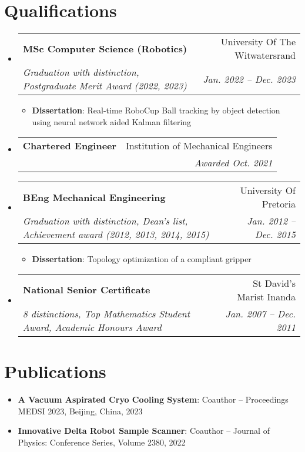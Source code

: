 \documentclass[letterpaper,11pt]{article}
\makeatletter
\newcommand{\resumeItem}[2]{
  \item\small{
    \textbf{#1}{: #2 \vspace{-2pt}}
  }
}
\newcommand{\resumeSubheading}[4]{
  \vspace{-1pt}\item
    \begin{tabular*}{0.97\textwidth}[t]{l@{\extracolsep{\fill}}r}
      \textbf{#1} & #2 \\
      \textit{\small#3} & \textit{\small #4} \\
    \end{tabular*}\vspace{-5pt}
}
\newcommand{\resumeSubItem}[2]{\resumeItem{#1}{#2}\vspace{-4pt}}
\newcommand{\resumeSubHeadingListStart}{\begin{itemize}[leftmargin=*]}
\newcommand{\resumeSubHeadingListEnd}{\end{itemize}}
\makeatother
\begin{document}
\section{Qualifications}
  \resumeSubHeadingListStart
    \resumeSubheading
      {MSc Computer Science (Robotics)} {University Of The Witwatersrand}
      {Graduation with distinction, Postgraduate Merit Award (2022, 2023)}{Jan. 2022 -- Dec. 2023}
        \resumeSubHeadingListStart
			\resumeSubItem{Dissertation}
      		{Real-time RoboCup Ball tracking by object detection using neural network aided Kalman filtering}
		\resumeSubHeadingListEnd
    \resumeSubheading
      {Chartered Engineer} {Institution of Mechanical Engineers}
      {}{Awarded Oct. 2021}
    \resumeSubheading
      {BEng Mechanical Engineering}{University Of Pretoria}
      {Graduation with distinction, Dean's list, Achievement award (2012, 2013, 2014, 2015)}{Jan. 2012 -- Dec. 2015}
    	\resumeSubHeadingListStart
			\resumeSubItem{Dissertation}
      		{Topology optimization of a compliant gripper}
		\resumeSubHeadingListEnd
     \resumeSubheading
      {National Senior Certificate}{St David’s Marist Inanda}
      {8 distinctions, Top Mathematics Student Award, Academic Honours Award}{Jan. 2007 -- Dec. 2011}
  \resumeSubHeadingListEnd


\section{Publications}
  \resumeSubHeadingListStart
    \resumeSubItem{A Vacuum Aspirated Cryo Cooling System}
      {Coauthor -- Proceedings MEDSI 2023, Beijing, China, 2023}
    \resumeSubItem{Innovative Delta Robot Sample Scanner}
      {Coauthor -- Journal of Physics: Conference Series, Volume 2380, 2022}
  \resumeSubHeadingListEnd

%


\end{document}
